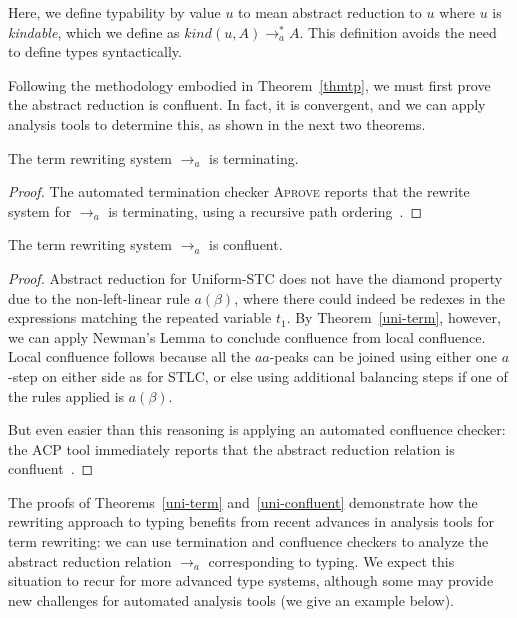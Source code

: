 \documentclass{LMCS}
\begin{document}
Here, we define typability by value $u$ to mean abstract reduction to
$u$ where $u$ is \emph{kindable}, which we define as
$\textit{kind}(u,A)\to_a^* A$.  This definition avoids the need to
define types syntactically.

Following the methodology embodied in Theorem~\ref{thmtp}, we must
first prove the abstract reduction is confluent.  In fact, it is
convergent, and we can apply analysis tools to determine this, as
shown in the next two theorems.

\begin{thm}
  \label{uni-term}
  The term rewriting system $\to_a$ is terminating.
\end{thm}

\begin{proof}
The automated termination checker \textsc{Aprove} reports that the
rewrite system for $\to_a$ is terminating, using a recursive path
ordering~\cite{aprove}.
\end{proof}

\begin{thm}
\label{uni-confluent}
  The term rewriting system  $\to_a$ is confluent.
\end{thm}
\begin{proof}
Abstract reduction for Uniform-STC does not have the diamond property
due to the non-left-linear rule $a(\beta)$, where there could indeed
be redexes in the expressions matching the repeated variable $t_1$.
By Theorem~\ref{uni-term}, however, we can apply Newman's Lemma to
conclude confluence from local confluence.  Local confluence follows
because all the $aa$-peaks can be joined using either one $a$-step on
either side as for STLC, or else using additional balancing steps if
one of the rules applied is $a(\beta)$.  

But even easier than this reasoning is applying an automated
confluence checker: the ACP tool immediately reports that the abstract
reduction relation is confluent~\cite{aoto+09}.
\end{proof}

The proofs of Theorems~\ref{uni-term} and~\ref{uni-confluent}
demonstrate how the rewriting approach to typing benefits from recent
advances in analysis tools for term rewriting: we can use termination
and confluence checkers to analyze the abstract reduction relation
$\to_a$ corresponding to typing.  We expect this situation to recur
for more advanced type systems, although some may provide new
challenges for automated analysis tools (we give an example below).
\end{document}
